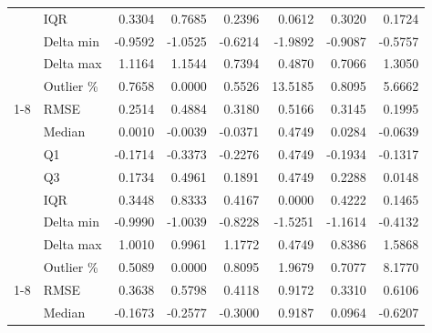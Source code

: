 \begin{table}[H]
\begin{tabular}{llrrrrrr}
 & IQR & {\cellcolor[HTML]{D1E7DD}} 0.3304 & 0.7685 & {\cellcolor[HTML]{D1E7DD}} 0.2396 & {\cellcolor[HTML]{F8D7DA}} 0.0612 & {\cellcolor[HTML]{D1E7DD}} 0.3020 & 0.1724 \\
 & Delta min & {\cellcolor[HTML]{D1E7DD}} -0.9592 & -1.0525 & {\cellcolor[HTML]{D1E7DD}} -0.6214 & -1.9892 & {\cellcolor[HTML]{D1E7DD}} -0.9087 & -0.5757 \\
 & Delta max & 1.1164 & 1.1544 & {\cellcolor[HTML]{D1E7DD}} 0.7394 & 0.4870 & {\cellcolor[HTML]{D1E7DD}} 0.7066 & 1.3050 \\
 & Outlier \% & 0.7658 & {\cellcolor[HTML]{D1E7DD}} 0.0000 & 0.5526 & 13.5185 & {\cellcolor[HTML]{F8D7DA}} 0.8095 & 5.6662 \\
\cline{1-8}
\multirow[c]{8}{*}{Autoencoder 3} & RMSE & 0.2514 & 0.4884 & 0.3180 & 0.5166 & 0.3145 & 0.1995 \\
 & Median & {\cellcolor[HTML]{D1E7DD}} 0.0010 & {\cellcolor[HTML]{D1E7DD}} -0.0039 & -0.0371 & 0.4749 & 0.0284 & -0.0639 \\
 & Q1 & -0.1714 & -0.3373 & -0.2276 & 0.4749 & {\cellcolor[HTML]{F8D7DA}} -0.1934 & -0.1317 \\
 & Q3 & 0.1734 & {\cellcolor[HTML]{F8D7DA}} 0.4961 & {\cellcolor[HTML]{F8D7DA}} 0.1891 & 0.4749 & 0.2288 & {\cellcolor[HTML]{D1E7DD}} 0.0148 \\
 & IQR & 0.3448 & 0.8333 & 0.4167 & {\cellcolor[HTML]{D1E7DD}} 0.0000 & 0.4222 & {\cellcolor[HTML]{D1E7DD}} 0.1465 \\
 & Delta min & -0.9990 & -1.0039 & -0.8228 & -1.5251 & {\cellcolor[HTML]{F8D7DA}} -1.1614 & {\cellcolor[HTML]{D1E7DD}} -0.4132 \\
 & Delta max & 1.0010 & {\cellcolor[HTML]{D1E7DD}} 0.9961 & {\cellcolor[HTML]{F8D7DA}} 1.1772 & 0.4749 & 0.8386 & {\cellcolor[HTML]{F8D7DA}} 1.5868 \\
 & Outlier \% & {\cellcolor[HTML]{D1E7DD}} 0.5089 & 0.0000 & 0.8095 & {\cellcolor[HTML]{D1E7DD}} 1.9679 & 0.7077 & 8.1770 \\
\cline{1-8}
\multirow[c]{8}{*}{Quantum} & RMSE & {\cellcolor[HTML]{F8D7DA}} 0.3638 & {\cellcolor[HTML]{F8D7DA}} 0.5798 & {\cellcolor[HTML]{F8D7DA}} 0.4118 & {\cellcolor[HTML]{F8D7DA}} 0.9172 & {\cellcolor[HTML]{F8D7DA}} 0.3310 & {\cellcolor[HTML]{F8D7DA}} 0.6106 \\
 & Median & {\cellcolor[HTML]{F8D7DA}} -0.1673 & {\cellcolor[HTML]{F8D7DA}} -0.2577 & {\cellcolor[HTML]{F8D7DA}} -0.3000 & {\cellcolor[HTML]{F8D7DA}} 0.9187 & {\cellcolor[HTML]{F8D7DA}} 0.0964 & {\cellcolor[HTML]{F8D7DA}} -0.6207 \\

\end{tabular}
\end{table}
